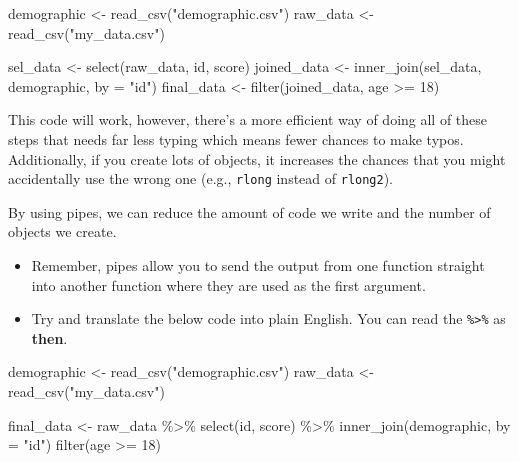 \documentclass[
  oneside]{book}
\newenvironment{Shaded}{\begin{snugshade}}{\end{snugshade}}
\newcommand{\AttributeTok}[1]{\textcolor[rgb]{0.77,0.63,0.00}{#1}}
\newcommand{\DecValTok}[1]{\textcolor[rgb]{0.00,0.00,0.81}{#1}}
\newcommand{\FunctionTok}[1]{\textcolor[rgb]{0.00,0.00,0.00}{#1}}
\newcommand{\NormalTok}[1]{#1}
\newcommand{\OtherTok}[1]{\textcolor[rgb]{0.56,0.35,0.01}{#1}}
\newcommand{\SpecialCharTok}[1]{\textcolor[rgb]{0.00,0.00,0.00}{#1}}
\newcommand{\StringTok}[1]{\textcolor[rgb]{0.31,0.60,0.02}{#1}}
\providecommand{\tightlist}{%
  \setlength{\itemsep}{0pt}\setlength{\parskip}{0pt}}
\begin{document}
\begin{Shaded}
\begin{Highlighting}[]
\NormalTok{demographic }\OtherTok{\textless{}{-}} \FunctionTok{read\_csv}\NormalTok{(}\StringTok{"demographic.csv"}\NormalTok{)}
\NormalTok{raw\_data }\OtherTok{\textless{}{-}} \FunctionTok{read\_csv}\NormalTok{(}\StringTok{"my\_data.csv"}\NormalTok{)}

\NormalTok{sel\_data }\OtherTok{\textless{}{-}} \FunctionTok{select}\NormalTok{(raw\_data, id, score)}
\NormalTok{joined\_data }\OtherTok{\textless{}{-}} \FunctionTok{inner\_join}\NormalTok{(sel\_data, demographic, }\AttributeTok{by =} \StringTok{"id"}\NormalTok{)}
\NormalTok{final\_data }\OtherTok{\textless{}{-}} \FunctionTok{filter}\NormalTok{(joined\_data, age }\SpecialCharTok{\textgreater{}=} \DecValTok{18}\NormalTok{)}
\end{Highlighting}
\end{Shaded}

This code will work, however, there's a more efficient way of doing all of these steps that needs far less typing which means fewer chances to make typos. Additionally, if you create lots of objects, it increases the chances that you might accidentally use the wrong one (e.g., \texttt{rlong} instead of \texttt{rlong2}).

By using pipes, we can reduce the amount of code we write and the number of objects we create.

\begin{itemize}
\tightlist
\item
  Remember, pipes allow you to send the output from one function straight into another function where they are used as the first argument.
\item
  Try and translate the below code into plain English. You can read the \texttt{\%\textgreater{}\%} as \textbf{then}.
\end{itemize}

\begin{Shaded}
\begin{Highlighting}[]
\NormalTok{demographic }\OtherTok{\textless{}{-}} \FunctionTok{read\_csv}\NormalTok{(}\StringTok{"demographic.csv"}\NormalTok{)}
\NormalTok{raw\_data }\OtherTok{\textless{}{-}} \FunctionTok{read\_csv}\NormalTok{(}\StringTok{"my\_data.csv"}\NormalTok{)}

\NormalTok{final\_data }\OtherTok{\textless{}{-}}\NormalTok{ raw\_data }\SpecialCharTok{\%\textgreater{}\%}
  \FunctionTok{select}\NormalTok{(id, score) }\SpecialCharTok{\%\textgreater{}\%}
  \FunctionTok{inner\_join}\NormalTok{(demographic, }\AttributeTok{by =} \StringTok{"id"}\NormalTok{)}
  \FunctionTok{filter}\NormalTok{(age }\SpecialCharTok{\textgreater{}=} \DecValTok{18}\NormalTok{) }
\end{Highlighting}
\end{Shaded}
\end{document}

